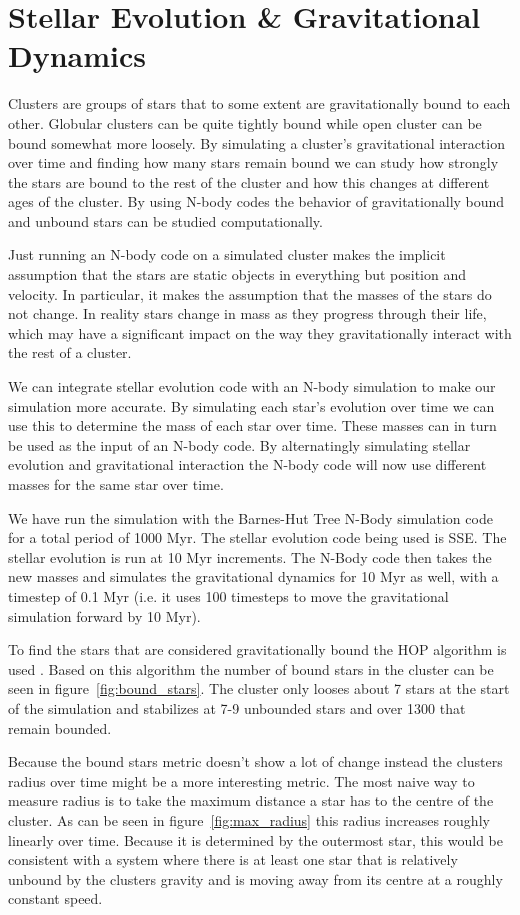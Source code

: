 \documentclass{aa}
\begin{document}
\section{Stellar Evolution \& Gravitational Dynamics} \label{sec:SE_GD}
Clusters are groups of stars that to some extent are gravitationally bound to each other. Globular clusters can be quite tightly bound while open cluster can be bound somewhat more loosely. By simulating a cluster's gravitational interaction over time and finding how many stars remain bound we can study how strongly the stars are bound to the rest of the cluster and how this changes at different ages of the cluster. By using N-body codes the behavior of gravitationally bound and unbound stars can be studied computationally.

Just running an N-body code on a simulated cluster makes the implicit assumption that the stars are static objects in everything but position and velocity. In particular, it makes the assumption that the masses of the stars do not change. In reality stars change in mass as they progress through their life, which may have a significant impact on the way they gravitationally interact with the rest of a cluster.

We can integrate stellar evolution code with an N-body simulation to make our simulation more accurate. By simulating each star's evolution over time we can use this to determine the mass of each star over time. These masses can in turn be used as the input of an N-body code. By alternatingly simulating stellar evolution and gravitational interaction the N-body code will now use different masses for the same star over time.

We have run the simulation with the Barnes-Hut Tree N-Body simulation code for a total period of 1000 Myr. The stellar evolution code being used is SSE. The stellar evolution is run at 10 Myr increments. The N-Body code then takes the new masses and simulates the gravitational dynamics for 10 Myr as well, with a timestep of 0.1 Myr (i.e. it uses 100 timesteps to move the gravitational simulation forward by 10 Myr).

To find the stars that are considered gravitationally bound the HOP algorithm is used \citep{1998ApJ...498..137E}. Based on this algorithm the number of bound stars in the cluster can be seen in figure~\ref{fig:bound_stars}. The cluster only looses about 7 stars at the start of the simulation and stabilizes at 7-9 unbounded stars and over 1300 that remain bounded. 

Because the bound stars metric doesn't show a lot of change instead the clusters radius over time might be a more interesting metric. The most naive way to measure radius is to take the maximum distance a star has to the centre of the cluster. As can be seen in figure~\ref{fig:max_radius} this radius increases roughly linearly over time. Because it is determined by the outermost star, this would be consistent with a system where there is at least one star that is relatively unbound by the clusters gravity and is moving away from its centre at a roughly constant speed. 
\end{document}
